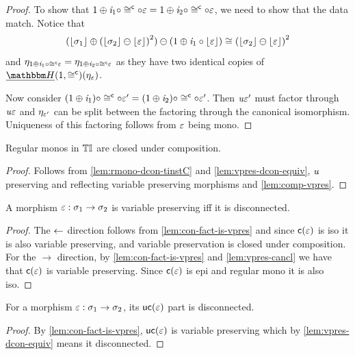 \begin{proof}
    To show that $1 \oplus \mathit{i}_1 \circ \cong^{\mathsf{c}} \circ \varepsilon = 1 \oplus \mathit{i}_2 \circ \cong^{\mathsf{c}} \circ \varepsilon$, we need to show that the data match.
    Notice that 
    \[ (\lfloor\sigma_1\rfloor \oplus {(\lfloor\sigma_2\rfloor \ominus \lfloor\varepsilon\rfloor)}^{2}) \ominus (1 \oplus \mathit{i}_1 \circ \lfloor\varepsilon\rfloor) \cong {(\lfloor\sigma_2\rfloor \ominus \lfloor\varepsilon\rfloor)}^{2} \]
    and $\eta_{1 \oplus \mathit{i}_1 \circ \cong^{\mathsf{c}} \varepsilon} = \eta_{1 \oplus \mathit{i}_2 \circ \cong^{\mathsf{c}} \varepsilon}$ as they have two identical copies of $\dheapF(1, \ciso)(\mvarM_\me)$. 

    Now consider $(1 \oplus \mathit{i}_1) \circ \cong^{\mathsf{c}} \circ \varepsilon' = (1 \oplus \mathit{i}_2) \circ \cong^{\mathsf{c}} \circ \varepsilon'$. 
    Then $\mathit{u}\varepsilon'$ must factor through $\mathit{u}\varepsilon$ and $\eta_{\varepsilon'}$ can be split between the factoring through the canonical isomorphism.
    Uniqueness of this factoring follows from $\varepsilon$ being mono.
\end{proof}

\begin{lemma}\label{lem:rmono-comp}
    Regular monos in ${\mathbb{T}\mathbb{I}}$ are closed under composition.
\end{lemma}
\begin{proof}
    Follows from \cref{lem:rmono-dcon-tinstC} and \cref{lem:vpres-dcon-equiv}, $\mathit{u}$ preserving and reflecting variable preserving morphisms and \cref{lem:comp-vpres}.
\end{proof}

\begin{lemma}\label{lem:vpres-dcon-equiv}
    A morphism $\varepsilon : \sigma_1 \to \sigma_2$ is variable preserving iff it is disconnected.
\end{lemma}
\begin{proof}
    The $\leftarrow$ direction follows from \cref{lem:con-fact-is-vpres} and since $\mathsf{c}(\varepsilon)$ is iso it is also variable preserving, and variable preservation is closed under composition.
    For the $\to$ direction, by \cref{lem:con-fact-is-vpres} and \cref{lem:vpres-cancl} we have that $\mathsf{c}(\varepsilon)$ is variable preserving.
    Since $\mathsf{c}(\varepsilon)$ is epi and regular mono it is also iso.
\end{proof}

\begin{lemma}\label{lem:con-fact-is-dcon}
    For a morphism $\varepsilon : \sigma_1 \to \sigma_2$, its $\mathsf{uc}(\varepsilon)$ part is disconnected.
\end{lemma}
\begin{proof}
    By \cref{lem:con-fact-is-vpres}, $\mathsf{uc}(\varepsilon)$ is variable preserving which by \cref{lem:vpres-dcon-equiv} means it disconnected.
\end{proof}

